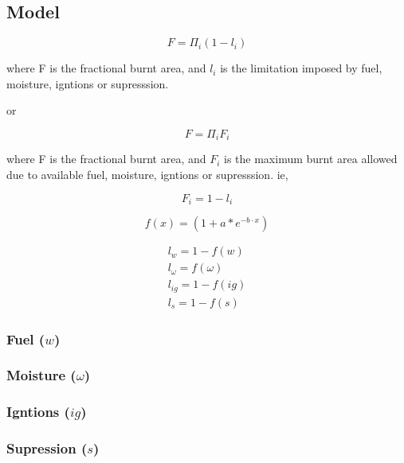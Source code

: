 \documentclass[12pt]{article}
\begin{document}
\subsection{Model}

\begin{equation}
    F=\Pi_{i} (1 - l_i)
\end{equation}

where F is the fractional burnt area, and $l_i$ is the limitation imposed by fuel, moisture, igntions or supresssion.
\newline

or

\begin{equation}
    F=\Pi_{i} F_i
\end{equation}

where F is the fractional burnt area, and $F_i$ is the maximum burnt area allowed due to available fuel, moisture, igntions or supresssion. ie,

\begin{equation}
    F_i = 1 - l_i
\end{equation}

\begin{equation}
    f(x) = (1 + a * e^{-b \cdot x})
\end{equation}

\begin{equation}
\begin{split}
    l_{w} = 1 - f(w) \\
    l_{\omega} = f(\omega) \\
    l_{ig} = 1 - f(ig) \\
    l_{s} = 1- f(s)
\end{split}
\end{equation}


\subsubsection{Fuel ($w$)}

\subsubsection{Moisture ($\omega$)}

\subsubsection{Igntions ($ig$)}

\subsubsection{Supression ($s$)}
\end{document}
